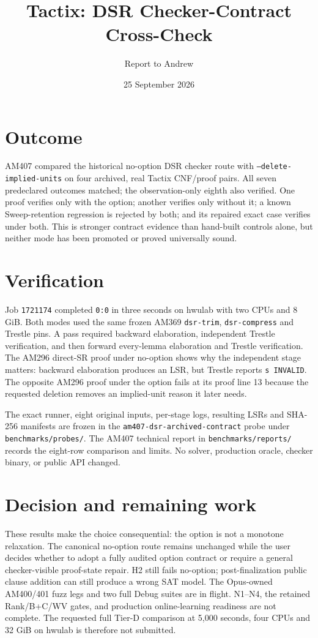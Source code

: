 \documentclass[11pt]{article}
\title{Tactix: DSR Checker-Contract Cross-Check}
\author{Report to Andrew}
\date{25 September 2026}
\begin{document}
\maketitle
\vspace{-1.5em}

\section*{Outcome}
AM407 compared the historical no-option DSR checker route with
\texttt{--delete-implied-units} on four archived, real Tactix CNF/proof pairs.
All seven predeclared outcomes matched; the observation-only eighth also
verified. One proof verifies only with the
option; another verifies only without it; a known Sweep-retention regression
is rejected by both; and its repaired exact case verifies under both. This
is stronger contract evidence than hand-built controls alone, but neither
mode has been promoted or proved universally sound.

\section*{Verification}
Job \texttt{1721174} completed \texttt{0:0} in three seconds on hwulab with
two CPUs and 8 GiB. Both modes used the same frozen AM369
\texttt{dsr-trim}, \texttt{dsr-compress} and Trestle pins. A pass required
backward elaboration, independent Trestle verification, and then forward
every-lemma elaboration and Trestle verification. The AM296 direct-SR proof
under no-option shows why the independent stage matters: backward elaboration
produces an LSR, but Trestle reports \texttt{s INVALID}. The opposite AM296
proof under the option fails at its proof line 13 because the requested
deletion removes an implied-unit reason it later needs.

The exact runner, eight original inputs, per-stage logs, resulting LSRs and
SHA-256 manifests are frozen in the \texttt{am407-dsr-archived-contract}
probe under \texttt{benchmarks/probes/}. The AM407 technical report in
\texttt{benchmarks/reports/} records the eight-row comparison and limits.
No solver, production oracle, checker binary, or public API changed.

\section*{Decision and remaining work}
These results make the choice consequential: the option is not a monotone
relaxation. The canonical no-option route remains unchanged while the user
decides whether to adopt a fully audited option contract or require a
general checker-visible proof-state repair. H2 still fails no-option;
post-finalization public clause addition can still produce a wrong SAT model.
The Opus-owned AM400/401 fuzz legs and two full Debug suites are in flight.
N1--N4, the retained Rank/B+C/WV gates, and production online-learning
readiness are not complete. The requested full Tier-D comparison at 5,000
seconds, four CPUs and 32 GiB on hwulab is therefore not submitted.
\end{document}
